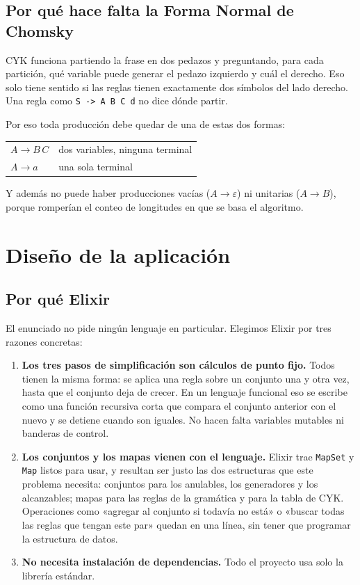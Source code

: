 \documentclass[11pt,a4paper]{article}
\newcommand{\gram}[1]{\texttt{#1}}
\begin{document}
\subsection{Por qué hace falta la Forma Normal de Chomsky}

CYK funciona partiendo la frase en dos pedazos y preguntando, para cada
partición, qué variable puede generar el pedazo izquierdo y cuál el derecho.
Eso solo tiene sentido si las reglas tienen exactamente dos símbolos del lado
derecho. Una regla como \gram{S -> A B C d} no dice dónde partir.

Por eso toda producción debe quedar de una de estas dos formas:

\begin{center}
\begin{tabular}{ll}
\toprule
$A \to B\,C$ & dos variables, ninguna terminal \\
$A \to a$    & una sola terminal \\
\bottomrule
\end{tabular}
\end{center}

Y además no puede haber producciones vacías ($A \to \varepsilon$) ni unitarias
($A \to B$), porque romperían el conteo de longitudes en que se basa el
algoritmo.

\section{Diseño de la aplicación}

\subsection{Por qué Elixir}

El enunciado no pide ningún lenguaje en particular. Elegimos Elixir por tres
razones concretas:

\begin{enumerate}[leftmargin=*]
  \item \textbf{Los tres pasos de simplificación son cálculos de punto fijo.}
  Todos tienen la misma forma: se aplica una regla sobre un conjunto una y otra
  vez, hasta que el conjunto deja de crecer. En un lenguaje funcional eso se
  escribe como una función recursiva corta que compara el conjunto anterior con
  el nuevo y se detiene cuando son iguales. No hacen falta variables mutables
  ni banderas de control.
  \item \textbf{Los conjuntos y los mapas vienen con el lenguaje.} Elixir trae
  \texttt{MapSet} y \texttt{Map} listos para usar, y resultan ser justo las dos
  estructuras que este problema necesita: conjuntos para los anulables, los
  generadores y los alcanzables; mapas para las reglas de la gramática y para
  la tabla de CYK. Operaciones como «agregar al conjunto si todavía no está» o
  «buscar todas las reglas que tengan este par» quedan en una línea, sin tener
  que programar la estructura de datos.
  \item \textbf{No necesita instalación de dependencias.} Todo el proyecto usa
  solo la librería estándar.
\end{enumerate}
\end{document}
